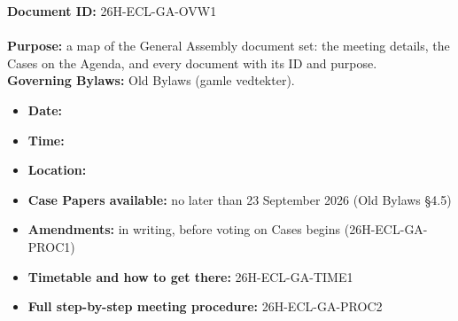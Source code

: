 \documentclass{../../../Common/Latex/Templates/rapport}
\date{\meetingdate, \meetingtime}
\begin{document}
\makecoverpage
\tableofcontents
\reportmainmatter

\noindent\textbf{Document ID:} 26H-ECL-GA-OVW1\\
\meetingline\\
\textbf{Purpose:} a map of the General Assembly document set: the meeting details, the Cases on the Agenda, and every document with its ID and purpose.\\
\textbf{Governing Bylaws:} Old Bylaws (gamle vedtekter).

\begin{itemize}
  \item \textbf{Date:} \meetingdate
  \item \textbf{Time:} \meetingtime
  \item \textbf{Location:} \meetinglocation
  \item \textbf{Case Papers available:} no later than 23 September 2026 (Old Bylaws \S4.5)
  \item \textbf{Amendments:} in writing, before voting on Cases begins (26H-ECL-GA-PROC1)
  \item \textbf{Timetable and how to get there:} 26H-ECL-GA-TIME1
  \item \textbf{Full step-by-step meeting procedure:} 26H-ECL-GA-PROC2
\end{itemize}
\end{document}
